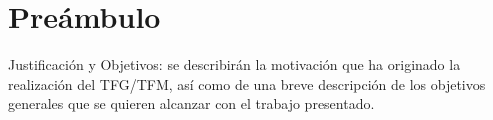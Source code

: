 
\chapter*{Preámbulo}

Justificación y Objetivos: se describirán la motivación que ha originado la
realización del TFG/TFM, así como de una breve descripción de los objetivos
generales que se quieren alcanzar con el trabajo presentado.
